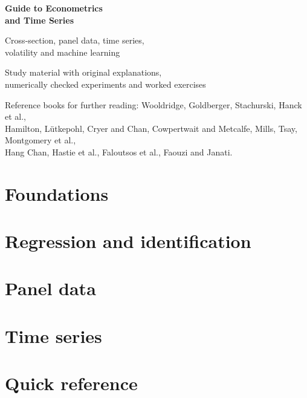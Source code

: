 

\frontmatter
\begin{titlepage}
\centering
\vspace*{3cm}
{\sffamily\bfseries\color{azul}\fontsize{28}{34}\selectfont Guide to Econometrics\\and Time Series\par}
\vspace{1cm}
{\sffamily\Large Cross-section, panel data, time series,\\volatility and machine learning\par}
\vspace{2cm}
{\large Study material with original explanations,\\numerically checked experiments and worked exercises\par}
\vfill
{\small Reference books for further reading: Wooldridge, Goldberger, Stachurski, Hanck et al.,\\Hamilton, Lütkepohl, Cryer and Chan, Cowpertwait and Metcalfe, Mills, Tsay, Montgomery et al.,\\Hang Chan, Hastie et al., Faloutsos et al., Faouzi and Janati.}
\end{titlepage}
\tableofcontents
\mainmatter

\part{Foundations}


\part{Regression and identification}



\part{Panel data}

\part{Time series}







\part{Quick reference}


